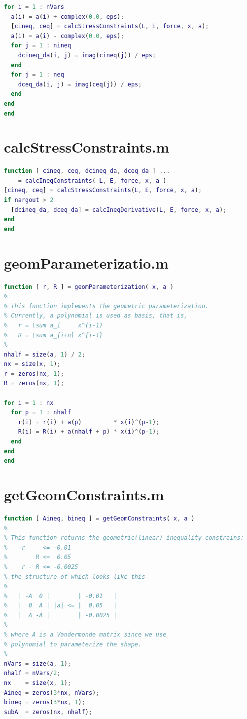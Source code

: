 \documentclass[a4paper]{article}
\begin{document}
\begin{appendices}
\begin{lstlisting}[language=Matlab]
for i = 1 : nVars
  a(i) = a(i) + complex(0.0, eps);
  [cineq, ceq] = calcStressConstraints(L, E, force, x, a);
  a(i) = a(i) - complex(0.0, eps);
  for j = 1 : nineq
    dcineq_da(i, j) = imag(cineq(j)) / eps;
  end
  for j = 1 : neq
    dceq_da(i, j) = imag(ceq(j)) / eps;
  end
end
end
\end{lstlisting}

\section{calcStressConstraints.m}\label{app:nonlcon}
\begin{lstlisting}[language=Matlab]
function [ cineq, ceq, dcineq_da, dceq_da ] ...
    = calcIneqConstraints( L, E, force, x, a )
[cineq, ceq] = calcStressConstraints(L, E, force, x, a);
if nargout > 2
  [dcineq_da, dceq_da] = calcIneqDerivative(L, E, force, x, a);
end
end
\end{lstlisting}

\section{geomParameterizatio.m}
\begin{lstlisting}[language=Matlab]
function [ r, R ] = geomParameterization( x, a )
%
% This function implements the geometric parameterization.
% Currently, a polynomial is used as basis, that is,
%   r = \sum a_i     x^(i-1)
%   R = \sum a_{i+n} x^{i-1}
%
nhalf = size(a, 1) / 2;
nx = size(x, 1);
r = zeros(nx, 1);
R = zeros(nx, 1);

for i = 1 : nx
  for p = 1 : nhalf
    r(i) = r(i) + a(p)         * x(i)^(p-1);
    R(i) = R(i) + a(nhalf + p) * x(i)^(p-1);
  end
end
end
\end{lstlisting}

\section{getGeomConstraints.m}\label{app:getgeomcon}
\begin{lstlisting}[language=Matlab]
function [ Aineq, bineq ] = getGeomConstraints( x, a )
%
% This function returns the geometric(linear) inequality constrains:
%   -r     <= -0.01
%        R <=  0.05
%    r - R <= -0.0025
% the structure of which looks like this
%
%   | -A  0 |        | -0.01   |
%   |  0  A | |a| <= |  0.05   |
%   |  A -A |        | -0.0025 |
%
% where A is a Vandermonde matrix since we use
% polynomial to parameterize the shape.
%
nVars = size(a, 1);
nhalf = nVars/2;
nx    = size(x, 1);
Aineq = zeros(3*nx, nVars);
bineq = zeros(3*nx, 1);  
subA  = zeros(nx, nhalf);


\end{lstlisting}
\end{appendices}
\end{document}
